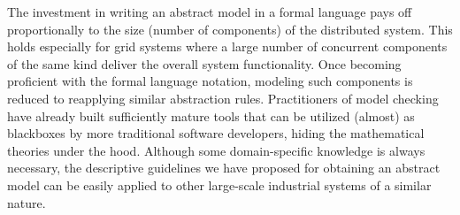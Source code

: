\documentclass[10pt,conference]{IEEEtran}
\begin{document}
The investment in writing an abstract model in a formal language 
pays off proportionally to the size (number of components) of the distributed system. 
This holds especially for grid systems where a large number of concurrent
 components of the same kind deliver the overall system functionality. 
Once becoming proficient with
the formal language notation, modeling such components is
reduced to reapplying similar abstraction rules.
Practitioners
of model checking have already built sufficiently mature tools
that can be utilized (almost) as blackboxes by more traditional
software developers, hiding the mathematical theories under
the hood. 
Although some domain-specific knowledge is always necessary,
the descriptive guidelines we have proposed for obtaining
an abstract model can be easily 
applied to other large-scale industrial systems of a similar nature.

 

\end{document}
